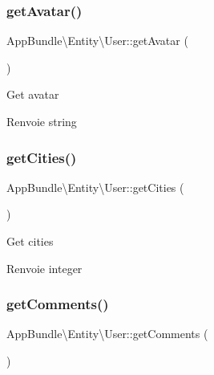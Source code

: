 \subsubsection{\texorpdfstring{get\+Avatar()}{getAvatar()}}
{\footnotesize\ttfamily App\+Bundle\textbackslash{}\+Entity\textbackslash{}\+User\+::get\+Avatar (\begin{DoxyParamCaption}{ }\end{DoxyParamCaption})}

Get avatar

\begin{DoxyReturn}{Renvoie}
string 
\end{DoxyReturn}
\mbox{\label{classAppBundle_1_1Entity_1_1User_a81b6376d8ea4d57d8e60252f63582ea7}} 
\subsubsection{\texorpdfstring{get\+Cities()}{getCities()}}
{\footnotesize\ttfamily App\+Bundle\textbackslash{}\+Entity\textbackslash{}\+User\+::get\+Cities (\begin{DoxyParamCaption}{ }\end{DoxyParamCaption})}

Get cities

\begin{DoxyReturn}{Renvoie}
integer 
\end{DoxyReturn}
\mbox{\label{classAppBundle_1_1Entity_1_1User_a8fbe81b221f53f304670755352cd470c}} 
\subsubsection{\texorpdfstring{get\+Comments()}{getComments()}}
{\footnotesize\ttfamily App\+Bundle\textbackslash{}\+Entity\textbackslash{}\+User\+::get\+Comments (\begin{DoxyParamCaption}{ }\end{DoxyParamCaption})}

